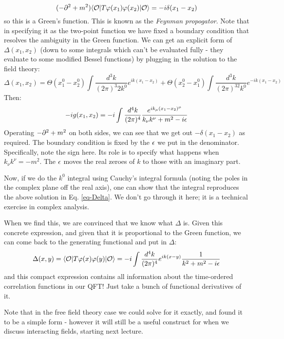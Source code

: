 \begin{equation}
    (-\p^2 + m^2)\bra{\O}T\varphi(x_1)\varphi(x_2)\ket{\O} = -i\delta(x_1 - x_2)
\end{equation}
so this is a Green's function.
This is known as the \emph{Feynman propogator}. Note that in specifying it as the two-point function we have fixed a boundary condition that resolves the ambiguity in the Green function. We can get an explicit form of $\Delta(x_1, x_2)$ (down to some integrals which can't be evaluated fully - they evaluate to some modified Bessel functions) by plugging in the solution to the field theory:
\begin{equation}\label{eq-Delta}
    \Delta(x_1, x_2) = \Theta(x_1^0 - x_2^0) \int \frac{d^3k}{(2\pi)^3 2k^0}e^{ik(x_1 - x_2)} + \Theta(x_2^0 - x_1^0)\int \frac{d^3k}{(2\pi)^32k^0} e^{-ik(x_1 - x_2)}
\end{equation}
Then:
\begin{equation}
    -ig(x_1, x_2) = -i\int \frac{d^4k}{(2\pi)^4} \frac{e^{ik_\mu (x_1 - x_2)^\mu}}{k_\nu k^\nu + m^2 - i\epsilon}
\end{equation}
Operating $-\partial^2 + m^2$ on both sides, we can see that we get out $-\delta(x_1 - x_2)$ as required. The boundary condition is fixed by the $\epsilon$ we put in the denominator. Specifically, note the sign here. Its role is to specify what happens when $k_\nu k^\nu = -m^2$. The $\epsilon$ moves the real zeroes of $k$ to those with an imaginary part. 

Now, if we do the $k^0$ integral using Cauchy's integral formula (noting the poles in the complex plane off the real axis), one can show that the integral reproduces the above solution in Eq. \eqref{eq-Delta}. We don't go through it here; it is a technical exercise in complex analysis. 

When we find this, we are convinced that we know what $\Delta$ is. Given this concrete expression, and given that it is proportional to the Green function, we can come back to the generating functional and put in $\Delta$:
\begin{equation}
    \Delta(x, y) = \bra{\O}T\varphi(x)\varphi(y)\ket{\O} = -i \int \frac{d^4k}{(2\pi)^4}e^{ik(x - y)}\frac{1}{k^2 + m^2 - i\e}
\end{equation}
and this compact expression contains all information about the time-ordered correlation functions in our QFT! Just take a bunch of functional derivatives of it.

Note that in the free field theory case we could solve for it exactly, and found it to be a simple form - however it will still be a useful construct for when we discuss interacting fields, starting next lecture.
